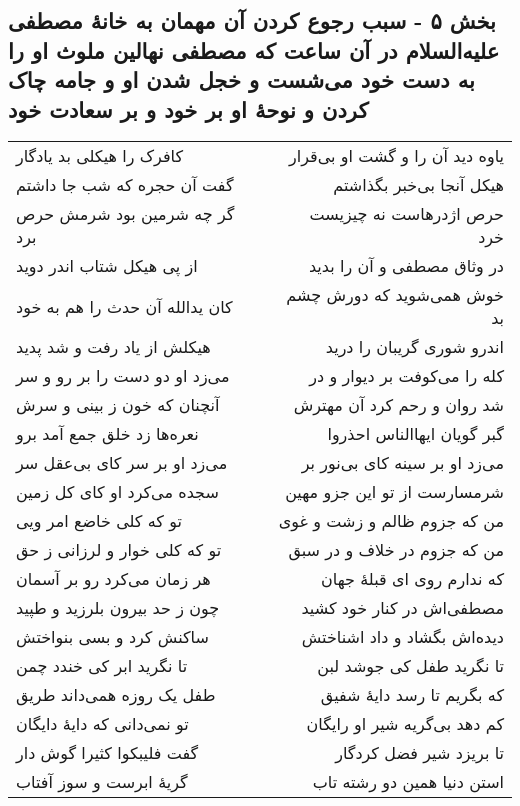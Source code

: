 \begin{center}
\section*{بخش ۵ - سبب رجوع کردن آن مهمان به خانهٔ مصطفی علیه‌السلام در آن ساعت که مصطفی نهالین ملوث او را به دست خود می‌شست و خجل شدن او و جامه چاک کردن و نوحهٔ او بر خود و بر سعادت خود}
\label{sec:sh005}
\begin{longtable}{l p{0.5cm} r}
کافرک را هیکلی بد یادگار
&&
یاوه دید آن را و گشت او بی‌قرار
\\
گفت آن حجره که شب جا داشتم
&&
هیکل آنجا بی‌خبر بگذاشتم
\\
گر چه شرمین بود شرمش حرص برد
&&
حرص اژدرهاست نه چیزیست خرد
\\
از پی هیکل شتاب اندر دوید
&&
در وثاق مصطفی و آن را بدید
\\
کان یدالله آن حدث را هم به خود
&&
خوش همی‌شوید که دورش چشم بد
\\
هیکلش از یاد رفت و شد پدید
&&
اندرو شوری گریبان را درید
\\
می‌زد او دو دست را بر رو و سر
&&
کله را می‌کوفت بر دیوار و در
\\
آنچنان که خون ز بینی و سرش
&&
شد روان و رحم کرد آن مهترش
\\
نعره‌ها زد خلق جمع آمد برو
&&
گبر گویان ایهاالناس احذروا
\\
می‌زد او بر سر کای بی‌عقل سر
&&
می‌زد او بر سینه کای بی‌نور بر
\\
سجده می‌کرد او کای کل زمین
&&
شرمسارست از تو این جزو مهین
\\
تو که کلی خاضع امر ویی
&&
من که جزوم ظالم و زشت و غوی
\\
تو که کلی خوار و لرزانی ز حق
&&
من که جزوم در خلاف و در سبق
\\
هر زمان می‌کرد رو بر آسمان
&&
که ندارم روی ای قبلهٔ جهان
\\
چون ز حد بیرون بلرزید و طپید
&&
مصطفی‌اش در کنار خود کشید
\\
ساکنش کرد و بسی بنواختش
&&
دیده‌اش بگشاد و داد اشناختش
\\
تا نگرید ابر کی خندد چمن
&&
تا نگرید طفل کی جوشد لبن
\\
طفل یک روزه همی‌داند طریق
&&
که بگریم تا رسد دایهٔ شفیق
\\
تو نمی‌دانی که دایهٔ دایگان
&&
کم دهد بی‌گریه شیر او رایگان
\\
گفت فلیبکوا کثیرا گوش دار
&&
تا بریزد شیر فضل کردگار
\\
گریهٔ ابرست و سوز آفتاب
&&
استن دنیا همین دو رشته تاب

\end{longtable}
\end{center}
